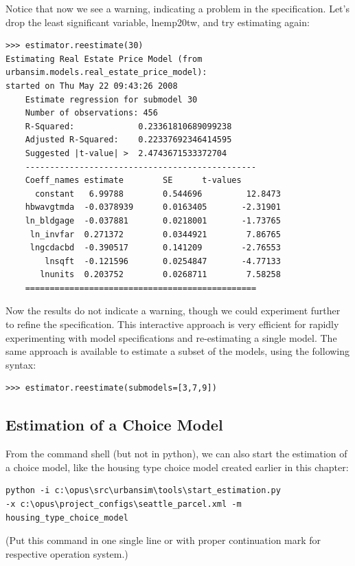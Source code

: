 Notice that now we see a warning, indicating a problem in
the specification.  Let's drop the least significant
variable, lnemp20tw, and try estimating again:

\begin{verbatim}
>>> estimator.reestimate(30)
Estimating Real Estate Price Model (from urbansim.models.real_estate_price_model): 
started on Thu May 22 09:43:26 2008
    Estimate regression for submodel 30
    Number of observations: 456
    R-Squared:             0.23361810689099238
    Adjusted R-Squared:    0.22337692346414595
    Suggested |t-value| >  2.4743671533372704
    -----------------------------------------------
    Coeff_names estimate        SE      t-values
      constant   6.99788        0.544696         12.8473
    hbwavgtmda  -0.0378939      0.0163405       -2.31901
    ln_bldgage  -0.037881       0.0218001       -1.73765
     ln_invfar  0.271372        0.0344921        7.86765
     lngcdacbd  -0.390517       0.141209        -2.76553
        lnsqft  -0.121596       0.0254847       -4.77133
       lnunits  0.203752        0.0268711        7.58258
    ===============================================
\end{verbatim}

Now the results do not indicate a warning, though we could
experiment further to refine the specification. This
interactive approach is very efficient for rapidly
experimenting with model specifications and re-estimating a
single model.  The same approach is available to estimate a
subset of the models, using the following syntax:

\begin{verbatim}
>>> estimator.reestimate(submodels=[3,7,9])
\end{verbatim}

\subsection{Estimation of a Choice Model}

From the command shell (but not in python), we can also
start the estimation of a choice model, like the housing
type choice model created earlier in this chapter:

\begin{verbatim}
python -i c:\opus\src\urbansim\tools\start_estimation.py 
-x c:\opus\project_configs\seattle_parcel.xml -m housing_type_choice_model 
\end{verbatim}
(Put this command in one single line or with proper continuation
mark for respective operation system.)

